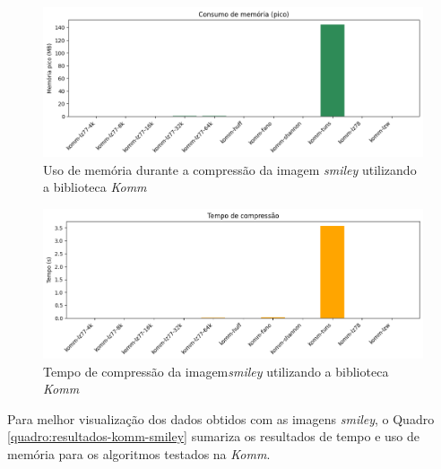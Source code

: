 \begin{figure}[h]
	\centering
	\caption{Uso de memória durante a compressão da imagem \textit{smiley} utilizando a biblioteca \textit{Komm}}
	\label{fig:fig:komm-smiley-memory}
	\includegraphics[width=15cm]{figuras/komm_smiley_memory.png}
\end{figure}

\begin{figure}[ht]
	\centering
	\caption{Tempo de compressão da imagem\textit{smiley} utilizando a biblioteca \textit{Komm}}
	\label{fig:fig:komm-smiley-time}
	\includegraphics[width=15cm]{figuras/komm_smiley_time.png}
\end{figure}

Para melhor visualização dos dados obtidos com as imagens \textit{smiley}, o Quadro \ref{quadro:resultados-komm-smiley} sumariza os resultados de tempo e uso de memória para os algoritmos testados na \textit{Komm}.

